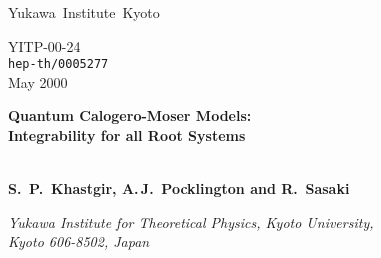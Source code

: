 \documentclass[a4paper,12pt]{article}
\begin{document}
%
\renewcommand{\theequation}{\arabic{section}.\arabic{equation}}
\newcommand{\tabtopsp}[1]{\vbox{\vbox to#1{}\vbox to12pt{}}}

\newcommand{\preprint}{
            \begin{flushleft}
   \elevenmib Yukawa\, Institute\, Kyoto\\
            \end{flushleft}\vspace{-1.3cm}
            \begin{flushright}\normalsize  \sf
            YITP-00-24\\
           {\tt hep-th/0005277} \\ May 2000
            \end{flushright}}
\newcommand{\Title}[1]{{\baselineskip=26pt \begin{center}
            \Large   \bf #1 \\ \ \\ \end{center}}}
\newcommand{\Author}{\begin{center}\large \bf
            S.\, P.\, Khastgir, A.\,J.\, Pocklington and R.\, Sasaki
     \end{center}}
\hspace*{0.7cm}%
\newcommand{\Address}{\begin{center} \it
            Yukawa Institute for Theoretical Physics, Kyoto
            University,\\ Kyoto 606-8502, Japan
      \end{center}}
\newcommand{\Accepted}[1]{\begin{center}{\large \sf #1}\\
            \vspace{1mm}{\small \sf Accepted for Publication}
            \end{center}}
\baselineskip=20pt

\preprint
\thispagestyle{empty}
\bigskip
\bigskip

\Title{Quantum Calogero-Moser Models: \\ Integrability for all Root Systems}
\Author

\Address
\vspace{1.5cm}
\end{document}
